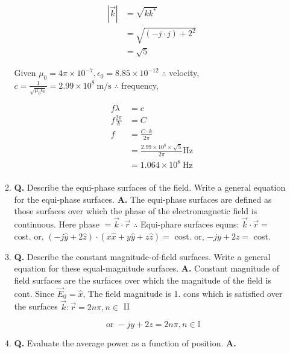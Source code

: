\documentclass[main.tex]{subfiles}
\begin{document}
\begin{enumerate}
\begin{enumerate}
        $$
        \begin{aligned}
        |\vec{k}| &=\sqrt{k k^*}\\
        &= \sqrt{(-j \cdot j)+2^2}\\
        &= \sqrt{5}
        \end{aligned}
        $$
        
        Given $\mu_0=4 \pi \times 10^{-7}, \epsilon_0=8.85 \times 10^{-12}$
        $\therefore$ velocity, $c=\frac{1}{\sqrt{\mu_0 \epsilon_0}}=2.99 \times 10^8 \mathrm{~m} / \mathrm{s}$ $\therefore$ frequency, 
        
        $$
        \begin{aligned}
        f \lambda &=c \\
        f \frac{2 \pi}{k} &= C \\
        f &=\frac{C \cdot k}{2 \pi}\\
        &= \frac{2.99 \times 10^8 \times \sqrt{5}}{2 \pi} \mathrm{Hz} \\
        &= 1.064 \times 10^8 \mathrm{~Hz} \\
        \end{aligned}
        $$
        
        \item \textbf{Q.} Describe the equi-phase surfaces of the field. Write a general equation for the equi-phase surfaces. \textbf{A.} The equi-phase surfaces are defined as those surfaces over which the phase of the electromagnetic field is continuous. Here phase $=\vec{k} \cdot \vec{r}$
        $\therefore$ Equi-phare surfaces equns:
        $\vec{k} \cdot \vec{r}=$ cost.
        or, $(-j \hat{y}+2 \hat{z}) \cdot(x \hat{x}+y \hat{y}+z \hat{z})=$ cost.
        or, $-j y+2 z=$ cost.
        
        \item \textbf{Q.} Describe the constant magnitude-of-field surfaces. Write a general equation for these equal-magnitude surfaces. \textbf{A.} Constant magnitude of field surfaces are the surfaces over which the magnitude of the field is cont. Since $\vec{E}_0=\hat{x}$, The field magnitude is 1. cons which is satisfied over the surfaces $\vec{k}: \vec{r}=2 n \pi, n \in$ II
        
        $$
        \text { or }-j y+2 z=2 n \pi, n \in \mathbb{I}
        $$
        
        \item \textbf{Q.} Evaluate the average power as a function of position. \textbf{A.} 
        

\end{enumerate}
\end{enumerate}
\end{document}
